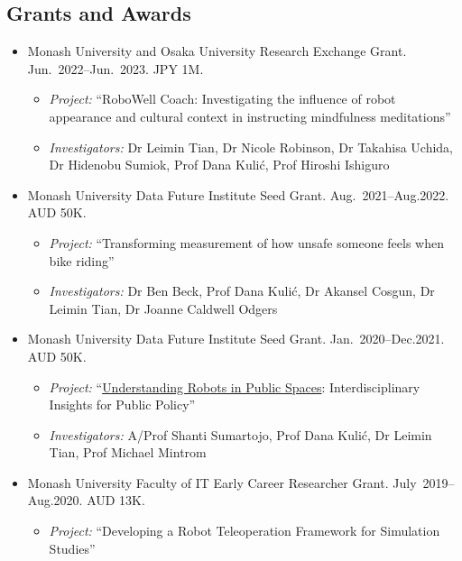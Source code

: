 \documentclass[11pt,letterpaper]{article}
\begin{document}
\subsection*{Grants and Awards}
\begin{itemize}
  \item Monash University and Osaka University Research Exchange Grant. Jun.~2022--Jun.~2023. JPY 1M.
  \begin{itemize}
    \item \emph{Project:} ``RoboWell Coach: Investigating the influence of robot appearance and cultural context in instructing mindfulness meditations''
    \item \emph{Investigators:} Dr Leimin Tian, Dr Nicole Robinson, Dr Takahisa Uchida, Dr Hidenobu Sumiok, Prof Dana Kuli{\'c}, Prof Hiroshi Ishiguro
  \end{itemize}
  \item Monash University Data Future Institute Seed Grant. Aug.~2021--Aug.2022. AUD 50K.
  \begin{itemize}
    \item \emph{Project:} ``Transforming measurement of how unsafe someone feels when bike riding''
    \item \emph{Investigators:} Dr Ben Beck, Prof Dana Kuli{\'c}, Dr Akansel Cosgun, Dr Leimin Tian, Dr Joanne Caldwell Odgers
  \end{itemize}
  \item Monash University Data Future Institute Seed Grant. Jan.~2020--Dec.2021. AUD 50K.
  \begin{itemize}
    \item \emph{Project:} ``\href{https://www.monash.edu/data-futures-institute/research/mdfi-flagship-projects/robots-in-public-space}{Understanding Robots in Public Spaces}: Interdisciplinary Insights for Public Policy''
    \item \emph{Investigators:} A/Prof Shanti Sumartojo, Prof Dana Kuli{\'c}, Dr Leimin Tian, Prof Michael Mintrom
  \end{itemize}
  \item Monash University Faculty of IT Early Career Researcher Grant. July~2019--Aug.2020. AUD 13K.
  \begin{itemize}
    \item \emph{Project:} ``Developing a Robot Teleoperation Framework for Simulation Studies''

\end{itemize}
\end{itemize}
\end{document}
